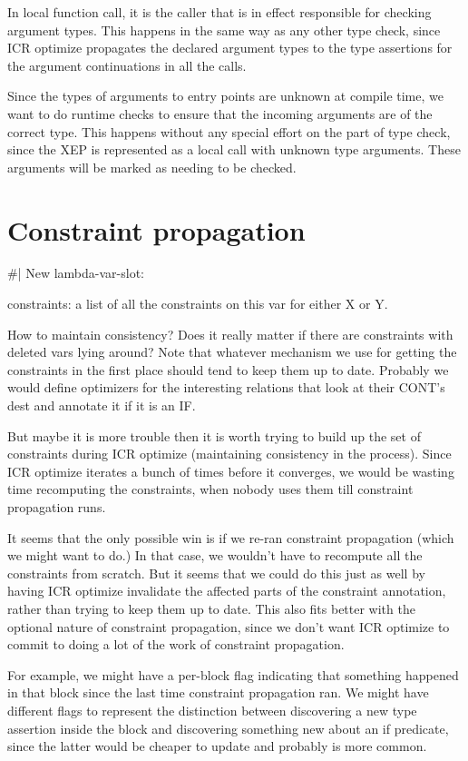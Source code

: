 In local function call, it is the caller that is in effect responsible for
checking argument types.  This happens in the same way as any other type check,
since ICR optimize propagates the declared argument types to the type
assertions for the argument continuations in all the calls.

Since the types of arguments to entry points are unknown at compile time, we
want to do runtime checks to ensure that the incoming arguments are of the
correct type.  This happens without any special effort on the part of type
check, since the XEP is represented as a local call with unknown type
arguments.  These arguments will be marked as needing to be checked.


\chapter{Constraint propagation}

\#|
New lambda-var-slot:

constraints: a list of all the constraints on this var for either X or Y.

How to maintain consistency?  Does it really matter if there are constraints
with deleted vars lying around?  Note that whatever mechanism we use for
getting the constraints in the first place should tend to keep them up to date.
Probably we would define optimizers for the interesting relations that look at
their CONT's dest and annotate it if it is an IF.

But maybe it is more trouble then it is worth trying to build up the set of
constraints during ICR optimize (maintaining consistency in the process).
Since ICR optimize iterates a bunch of times before it converges, we would be
wasting time recomputing the constraints, when nobody uses them till constraint
propagation runs.  

It seems that the only possible win is if we re-ran constraint propagation
(which we might want to do.)  In that case, we wouldn't have to recompute all
the constraints from scratch.  But it seems that we could do this just as well
by having ICR optimize invalidate the affected parts of the constraint
annotation, rather than trying to keep them up to date.  This also fits better
with the optional nature of constraint propagation, since we don't want ICR
optimize to commit to doing a lot of the work of constraint propagation.  

For example, we might have a per-block flag indicating that something happened
in that block since the last time constraint propagation ran.  We might have
different flags to represent the distinction between discovering a new type
assertion inside the block and discovering something new about an if
predicate, since the latter would be cheaper to update and probably is more
common.

